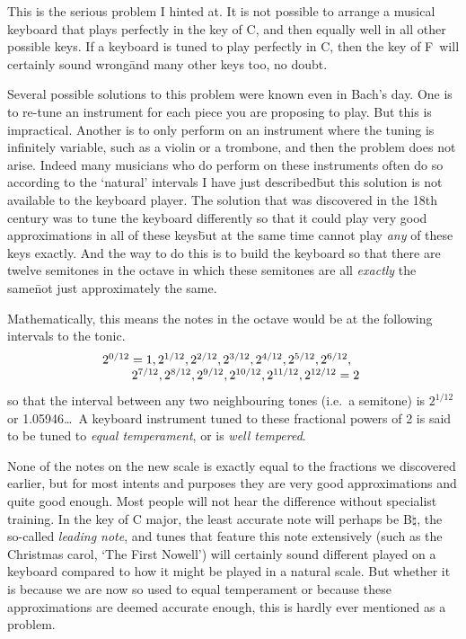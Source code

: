 This is the serious problem I hinted at.  It is not possible to
arrange a musical keyboard that plays perfectly in the key of C, and
then equally well in all other possible keys.  If a keyboard is tuned
to play perfectly in C, then the key of F\sh\ will certainly sound
wrong\=and many other keys too, no doubt.

Several possible solutions to this problem were known even in Bach's
day.  One is to re-tune an instrument for each piece you are proposing
to play. But this is impractical.  Another is to only perform on an instrument
where the tuning is infinitely variable, such as a violin or a
trombone, and then the problem does not arise.  Indeed many musicians
who do perform on these instruments often do so according to the `natural' intervals I
have just described\=but this solution is not available to the
keyboard player.  The solution that was discovered in the 18th century
was to tune the keyboard differently so that it could play very good
approximations in all of these keys\=but at the same time cannot
play \textit{any} of these keys exactly.  And the way to do this is to
build the keyboard so that there are twelve semitones in the octave
in which these semitones are all \textit{exactly} the same\=not just approximately
the same.

Mathematically, this means the notes in the octave
would be at the following intervals to the tonic.
\[\begin{array}{cc}
\hskip -1em
2^{0/12} = 1,
2^{1/12},
2^{2/12},
2^{3/12},
2^{4/12},
2^{5/12},
2^{6/12},\\
\qquad
2^{7/12},
2^{8/12},
2^{9/12},
2^{10/12},
2^{11/12},
2^{12/12}=2
\end{array}
\]
so that the interval between any two neighbouring tones (i.e.~a semitone) is $2^{1/12}$ or
1.05946\ldots\ 
A keyboard instrument tuned to these fractional powers of 2 is said to be
tuned to \textit{equal temperament}, or is \textit{well tempered}.

None of the notes on the new scale is exactly equal to the fractions
we discovered earlier, but for most intents and purposes they are very
good approximations and quite good enough. Most people will not hear
the difference without specialist training. In the key of C major,
the least accurate note will perhaps be B$\natural$, the
so-called \textit{leading note}, and tunes that feature this note
extensively (such as the Christmas carol, `The First Nowell') will
certainly sound different played on a keyboard compared to how it might be played in a natural
scale.  But whether it is because we are now so used to equal temperament
or because these approximations are deemed accurate enough, this
is hardly ever mentioned as a problem.

